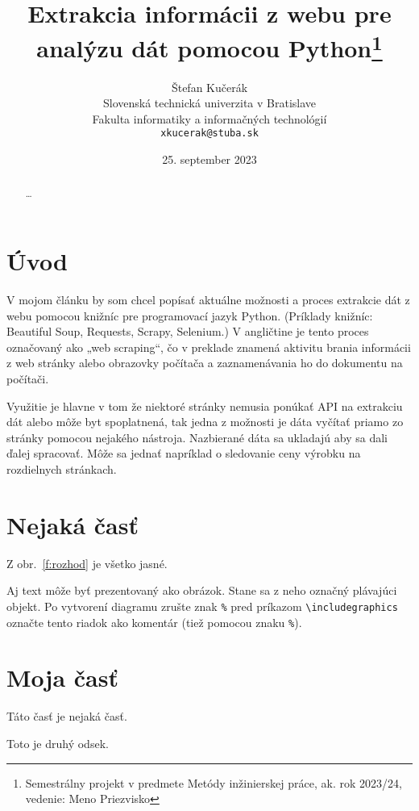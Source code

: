 \documentclass[10pt,twoside,slovak,a4paper]{coursepaper}
\title{Extrakcia informácii z webu pre analýzu dát pomocou Python\thanks{Semestrálny projekt v predmete Metódy inžinierskej práce, ak. rok 2023/24, vedenie: Meno Priezvisko}} %
\author{Štefan Kučerák\\[2pt]
	{\small Slovenská technická univerzita v Bratislave}\\
	{\small Fakulta informatiky a informačných technológií}\\
	{\small \texttt{xkucerak@stuba.sk}}
	}
\date{\small 25. september 2023} %
\begin{document}
\maketitle

\begin{abstract}
\ldots
\end{abstract}



\section{Úvod}

V mojom článku by som chcel popísať aktuálne možnosti a proces extrakcie dát z webu
pomocou knižníc pre programovací jazyk Python. (Príklady knižníc: Beautiful Soup, Requests, Scrapy,
Selenium.) V angličtine je tento proces označovaný ako „web scraping“, čo v preklade znamená aktivitu
brania informácii z web stránky alebo obrazovky počítača a zaznamenávania ho do dokumentu na
počítači.


Využitie je hlavne v tom že niektoré stránky nemusia ponúkať API na extrakciu dát alebo môže
byt spoplatnená, tak jedna z možnosti je dáta vyčítať priamo zo stránky pomocou nejakého nástroja.
Nazbierané dáta sa ukladajú aby sa dali ďalej spracovať. Môže sa jednať napríklad o sledovanie ceny
výrobku na rozdielnych stránkach.

\section{Nejaká časť} \label{nejaka}

Z obr.~\ref{f:rozhod} je všetko jasné. 

\begin{figure*}[tbh]
\centering
Aj text môže byť prezentovaný ako obrázok. Stane sa z neho označný plávajúci objekt. Po vytvorení diagramu zrušte znak \texttt{\%} pred príkazom \verb|\includegraphics| označte tento riadok ako komentár (tiež pomocou znaku \texttt{\%}).
\caption{Rozhodujúci argument.}
\label{f:rozhod}
\end{figure*}

\section{Moja časť} \label{moja}

Táto časť je nejaká časť.

Toto je druhý odsek.
\end{document}
